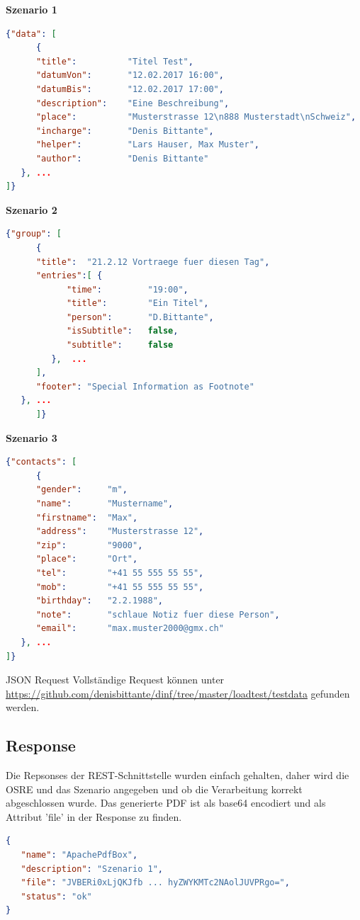 \documentclass[main.tex]{subfiles}
\begin{document}
\textbf{Szenario 1}

\begin{lstlisting}[language=json]
{"data": [
      {
      "title":          "Titel Test",
      "datumVon":       "12.02.2017 16:00",
      "datumBis":       "12.02.2017 17:00",
      "description":    "Eine Beschreibung",
      "place":          "Musterstrasse 12\n888 Musterstadt\nSchweiz",
      "incharge":       "Denis Bittante",
      "helper":         "Lars Hauser, Max Muster",
      "author":         "Denis Bittante"
   }, ...
]}


\end{lstlisting}


\textbf{Szenario 2}

\begin{lstlisting}[language=json]
{"group": [
      {
      "title":  "21.2.12 Vortraege fuer diesen Tag",
      "entries":[ {
            "time":         "19:00",
            "title":        "Ein Titel",
            "person":       "D.Bittante",
            "isSubtitle":   false,
            "subtitle":     false
         },  ...
      ],
      "footer": "Special Information as Footnote"
   }, ...
      ]}


\end{lstlisting}


\textbf{Szenario 3}

\begin{lstlisting}[language=json]
{"contacts": [
      {
      "gender":     "m",
      "name":       "Mustername",
      "firstname":  "Max",
      "address":    "Musterstrasse 12",
      "zip":        "9000",
      "place":      "Ort",
      "tel":        "+41 55 555 55 55",
      "mob":        "+41 55 555 55 55",
      "birthday":   "2.2.1988",
      "note":       "schlaue Notiz fuer diese Person",
      "email":      "max.muster2000@gmx.ch"
   }, ...
]}


\end{lstlisting}

\begin{reference}{JSON Request}
 Vollständige Request können unter \url{https://github.com/denisbittante/dinf/tree/master/loadtest/testdata} gefunden werden.
\end{reference}
 


\subsection{Response}
Die Repsonses der REST-Schnittstelle wurden einfach gehalten, daher wird die OSRE und das Szenario angegeben und ob die Verarbeitung korrekt abgeschlossen wurde. Das generierte PDF ist als base64 encodiert und als Attribut 'file' in der Response zu finden. 
\begin{lstlisting}[language=json]
{
   "name": "ApachePdfBox",
   "description": "Szenario 1",
   "file": "JVBERi0xLjQKJfb ... hyZWYKMTc2NAolJUVPRgo=",
   "status": "ok"
}

\end{lstlisting}
\end{document}
